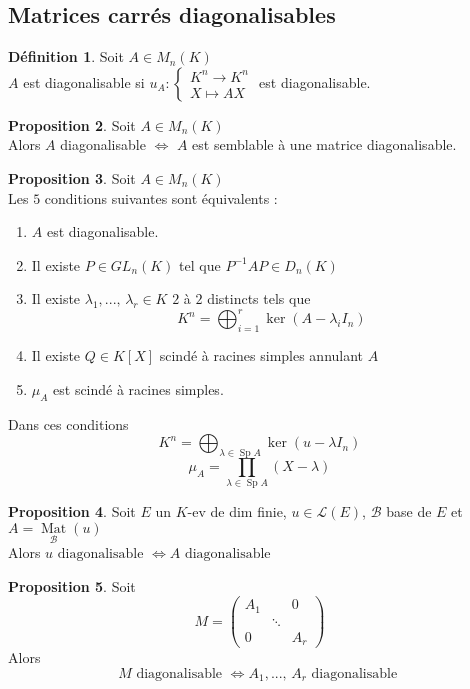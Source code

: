\documentclass[10pt,a4paper]{article}
\theoremstyle{definition}
\newtheorem{proposition}{Proposition}[section]
\newtheorem{definition}[proposition]{Définition}
\DeclareMathOperator{\Sp}{Sp}
\DeclareMathOperator*{\Mat}{Mat}
\begin{document}
\subsection{Matrices carrés diagonalisables}
\begin{definition}
Soit $A \in M_n(K)$ \\
$A$ est diagonalisable si $u_A : \begin{cases}
K^n \to K^n \\
X \mapsto AX
\end{cases}$ est diagonalisable.
\end{definition}
\begin{proposition}
Soit $A \in M_n(K)$ \\
Alors $A$ diagonalisable $\iff$ $A$ est semblable à une matrice diagonalisable.
\end{proposition}
\begin{proposition}
Soit $A \in M_n(K)$ \\
Les $5$ conditions suivantes sont équivalents :
\begin{enumerate}
\item $A$ est diagonalisable.
\item Il existe $P \in GL_n(K)$ tel que $P^{-1}AP \in D_n(K)$
\item Il existe $\lambda_1, ...,\, \lambda_r \in K$ $2$ à $2$ distincts tels que
\[ K^n = \bigoplus_{i = 1}^r \ker \left( A - \lambda_i I_n \right) \]
\item Il existe $Q \in K[X]$ scindé à racines simples annulant $A$
\item $\mu_A$ est scindé à racines simples.
\end{enumerate}
Dans ces conditions
\[ \boxed{K^n = \bigoplus_{\lambda \in \Sp A} \ker \left( u - \lambda I_n \right)} \]
\[ \boxed{\mu_A = \prod_{\lambda \in \Sp A} (X - \lambda)} \]
\end{proposition}
\begin{proposition}
Soit $E$ un $K$-ev de dim finie, $u \in \mathcal{L}(E)$, $\mathcal{B}$ base de $E$ et $A = \Mat\limits_{\mathcal{B}}(u)$ \\
Alors $\boxed{u \text{ diagonalisable } \iff A \text{ diagonalisable }}$
\end{proposition}
\begin{proposition}
Soit 
\[ M = \begin{pmatrix}
\boxed{A_1} & & 0 \\
& \ddots &  \\
0 & & \boxed{A_r}
\end{pmatrix} \]
Alors \[ \boxed{M \text{ diagonalisable } \iff A_1, ...,\, A_r \text{ diagonalisable }} \]
\end{proposition}
\end{document}
